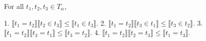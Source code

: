 For all $t_1, t_2, t_3 \in T_{\alpha}$,

1. $\llbracket t_1 = t_2 \rrbracket \llbracket t_2 \in t_3 \rrbracket \leq \llbracket t_1 \in t_3 \rrbracket$.
2. $\llbracket t_1 = t_2 \rrbracket \llbracket t_3 \in t_1 \rrbracket \leq \llbracket t_3 \in t_2 \rrbracket$.
3. $\llbracket t_1 = t_2 \rrbracket \llbracket t_3 = t_1 \rrbracket \leq \llbracket t_3 = t_2 \rrbracket$.
4. $\llbracket t_1 = t_2 \rrbracket \llbracket t_2 = t_3 \rrbracket \leq \llbracket t_1 = t_3 \rrbracket$.
